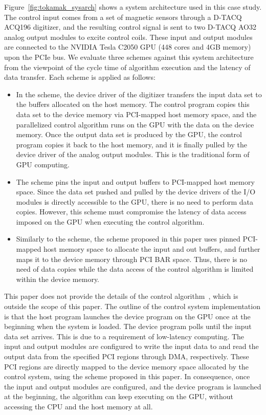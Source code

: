 Figure~\ref{fig:tokamak_sysarch} shows a system architecture used in
this case study.
The control input comes from a set of magnetic sensors through a D-TACQ
ACQ196 digitizer, and the resulting control signal is sent to two D-TACQ
AO32 analog output modules to excite control coils.
These input and output modules are connected to the NVIDIA Tesla C2050
GPU (448 cores and 4GB memory) upon the PCIe bus.
We evaluate three schemes against this system architecture
from the viewpoint of the cycle time of algorithm execution and the
latency of data transfer. 
Each scheme is applied as follows:
\begin{itemize}
 \item In the {\hd} scheme, the device driver of the digitizer transfers
       the input data set to the buffers allocated on the host memory.
       The control program copies this data set to the device memory via
       PCI-mapped host memory space, and the parallelized control
       algorithm runs on the GPU with the data on the device memory.
       Once the output data set is produced by the GPU, the control
       program copies it back to the host memory, and it is finally
       pulled by the device driver of the analog output modules.
       This is the traditional form of GPU computing.
 \item The {\hp} scheme pins the input and output buffers to PCI-mapped
       host memory space.
       Since the data set pushed and pulled by the device drivers of
       the I/O modules is directly accessible to the GPU, there is no
       need to perform data copies.
       However, this scheme must compromise the latency of data access
       imposed on the GPU when executing the control algorithm.
 \item Similarly to the {\hp} scheme, the {\dm} scheme proposed in this
       paper uses pinned PCI-mapped host memory space to allocate the
       input and out buffers, and further maps it to the device memory
       through PCI BAR space.
       Thus, there is no need of data copies while the data access of
       the control algorithm is limited within the device memory.
\end{itemize}

This paper does not provide the details of the control
algorithm~\cite{Boozer_PP99}, which is outside the scope of this paper.
The outline of the control system implementation is that the host
program launches the device program on the GPU once at the beginning
when the system is loaded.
The device program polls until the input data set arrives.
This is due to a requirement of low-latency computing.
The input and output modules are configured to write the input data to
and read the output data from the specified PCI regions through DMA,
respectively.
These PCI regions are directly mapped to the device memory space
allocated by the control system, using the {\dm} scheme proposed in this
paper.
In consequence, once the input and output modules are configured, and
the device program is launched at the beginning, the algorithm can keep
executing on the GPU, without accessing the CPU and the host memory at
all.

